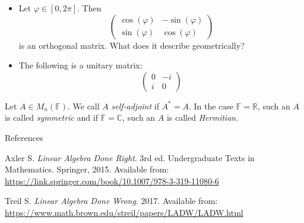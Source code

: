\documentclass [aspectratio=169]{beamer}
\newcommand{\R}{{\mathbb{R}}}
\newcommand{\C}{{\mathbb{C}}}
\newcommand{\F}{{\mathbb{F}}}
\begin{document}
\begin{frame}
\begin{example}
\begin{itemize}
    \item Let $\varphi \in [0,2\pi]$. Then 
    \begin{equation*}
        \begin{pmatrix}
            \cos(\varphi) & -\sin(\varphi) \\
            \sin(\varphi) & \cos(\varphi)
        \end{pmatrix}
    \end{equation*}
    is an orthogonal matrix. What does it describe geometrically?
    \item The following is a unitary matrix:
        \begin{equation*}
        \begin{pmatrix}
            0 & -i \\
            i & 0
        \end{pmatrix}
    \end{equation*}
\end{itemize}
\end{example}
\end{frame}


\begin{frame}
\begin{definition}
Let $A\in M_n(\F)$. We call $A$ \emph{self-adjoint} if $A^* = A$. In the case $\F = \R$, such an $A$ is called \emph{symmetric} and if $\F = \C$, such an $A$ is called \emph{Hermitian}.
\end{definition}
\end{frame}





\begin{frame}{References}

Axler S. \textit{Linear Algebra Done Right}. 3rd ed. Undergraduate Texts in Mathematics. Springer, 2015.
Available from: \href{https://link.springer.com/book/10.1007/978-3-319-11080-6}{https://link.springer.com/book/10.1007/978-3-319-11080-6} 

\vspace{1em}


\indent Treil S. \textit{Linear Algebra Done Wrong}. 2017. Available from: \href{https://www.math.brown.edu/streil/papers/LADW/LADW.html}{https://www.math.brown.edu/streil/papers/LADW/LADW.html}
\end{frame}
\end{document}
